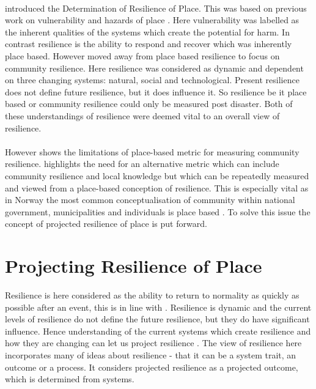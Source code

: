 \paragraph{}


\cite{cutter_place-based_2008} introduced the Determination of Resilience of Place. This was based on previous work on vulnerability and hazards of place \cite{cutter_vulnerability_1996}. Here vulnerability was labelled as the inherent qualities of the systems which create the potential for harm.
In contrast resilience is the ability to respond and recover which was inherently place based. However \cite{cutter_community_2020} moved away from place based resilience to focus on community resilience. Here resilience was considered as dynamic and dependent on three changing systems: natural, social and technological. Present resilience does not define future resilience, but it does influence it. So resilience be it place based or community resilience could only be measured post disaster. Both of these understandings of resilience were deemed vital to an overall view of resilience.
\paragraph{}

However \cite{rasanen_conceptualizing_2020} shows the limitations of place-based metric for measuring community resilience. \cite{rasanen_conceptualizing_2020} highlights the need for an alternative metric which can include community resilience and local knowledge but which can be repeatedly measured and viewed from a place-based conception of resilience. This is especially vital as in Norway the most common conceptualisation of community within national government, municipalities and individuals is place based \cite{rasanen_conceptualizing_2020}. To solve this issue the concept of projected resilience of place is put forward. 




\section{Projecting Resilience of Place} 
Resilience is here considered as the ability to return to normality as quickly as possible after an event, this is in line with \cite{cutter_place-based_2008}. Resilience is dynamic and the current levels of resilience do not define the future resilience, but they do have significant influence. Hence understanding of the current systems which create resilience and how they are changing can let us project resilience \cite{cutter_community_2020}. The view of resilience here incorporates many of \cite{moser_turbulent_2019} ideas about resilience -  that it can be a system trait, an outcome or a process. It considers projected resilience as a projected outcome, which is determined from systems. 

